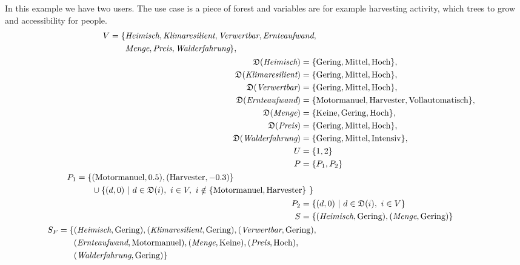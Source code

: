 \documentclass{article}
\begin{document}
\begin{mdframed}[frametitle={Forest Example}]
    In this example we have two users. The use case is a piece of forest and variables are for example harvesting activity, which trees to grow and accessibility for people.
    \begin{align}
        \begin{split}
            V = \{ & \textit{Heimisch}, \textit{Klimaresilient}, \textit{Verwertbar}, \textit{Ernteaufwand}, \\
            & \textit{Menge}, \textit{Preis}, \textit{Walderfahrung} \},
        \end{split} \notag \\
        \mathfrak{D}(\textit{Heimisch}) =  \{ & \text{Gering}, \text{Mittel}, \text{Hoch}\}, \notag \\
        \mathfrak{D}(\textit{Klimaresilient}) = \{ & \text{Gering}, \text{Mittel}, \text{Hoch}\}, \notag \\
        \mathfrak{D}(\textit{Verwertbar}) = \{ & \text{Gering}, \text{Mittel}, \text{Hoch}\}, \notag \\
        \mathfrak{D}(\textit{Ernteaufwand}) = \{ & \text{Motormanuel}, \text{Harvester}, \text{Vollautomatisch}\}, \notag \\
        \mathfrak{D}(\textit{Menge}) = \{ & \text{Keine}, \text{Gering}, \text{Hoch}\}, \notag \\
        \mathfrak{D}(\textit{Preis}) = \{ & \text{Gering}, \text{Mittel}, \text{Hoch}\}, \notag\\
        \mathfrak{D}(\textit{Walderfahrung}) = \{ & \text{Gering}, \text{Mittel}, \text{Intensiv}\},\notag \\
        U = \{ & 1,2\} \notag\\
        P = \{ & P_1, P_2\} \notag\\
        \begin{split}
            P_1 = \{ & (\text{Motormanuel}, 0.5), (\text{Harvester}, -0.3) \} \\ 
            & \cup \{ (d,0)\ |\ d \in \mathfrak{D}(i),\ i \in V,\ i \notin \{ \text{Motormanuel}, \text{Harvester}\} \ \} \ 
        \end{split} \notag \\
        P_2 = \{ & (d,0)\ |\ d \in \mathfrak{D}(i),\ i \in V \} \notag \\
        S  =  \{ & (\textit{Heimisch}, \text{Gering}), (\textit{Menge}, \text{Gering}) \} \notag \\
        \begin{split}
        S_F  =  \{ & (\textit{Heimisch}, \text{Gering}), (\textit{Klimaresilient}, \text{Gering}), (\textit{Verwertbar}, \text{Gering}), \\
        & (\textit{Ernteaufwand}, \text{Motormanuel}),
        (\textit{Menge}, \text{Keine}), (\textit{Preis}, \text{Hoch}),\\ 
        & (\textit{Walderfahrung}, \text{Gering}) \} 
        \end{split} \notag
    \end{align}
\end{mdframed}
\end{document}
